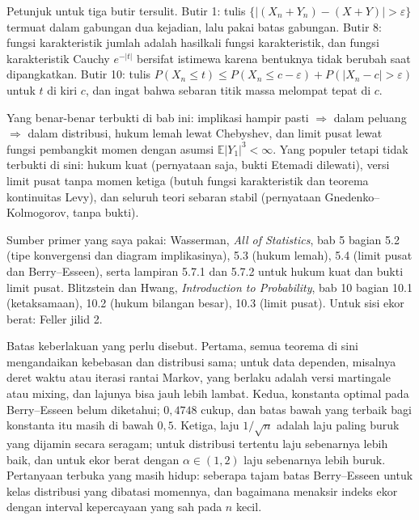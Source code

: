 \begin{latihan}
Petunjuk untuk tiga butir tersulit. Butir 1: tulis
$\{|(X_n+Y_n)-(X+Y)|>\varepsilon\}$ termuat dalam gabungan dua kejadian, lalu
pakai batas gabungan. Butir 8: fungsi karakteristik jumlah adalah hasilkali
fungsi karakteristik, dan fungsi karakteristik Cauchy $e^{-|t|}$ bersifat
istimewa karena bentuknya tidak berubah saat dipangkatkan. Butir 10: tulis
$P(X_n\le t)\le P(X_n\le c-\varepsilon)+P(|X_n-c|>\varepsilon)$ untuk $t$ di
kiri $c$, dan ingat bahwa sebaran titik massa melompat tepat di $c$.
\end{latihan}

\begin{untukpeneliti}
Yang benar-benar terbukti di bab ini: implikasi hampir pasti $\Rightarrow$ dalam
peluang $\Rightarrow$ dalam distribusi, hukum lemah lewat Chebyshev, dan limit
pusat lewat fungsi pembangkit momen dengan asumsi $\mathbb{E}|Y_1|^3<\infty$.
Yang populer tetapi tidak terbukti di sini: hukum kuat (pernyataan saja, bukti
Etemadi dilewati), versi limit pusat tanpa momen ketiga (butuh fungsi
karakteristik dan teorema kontinuitas Levy), dan seluruh teori sebaran stabil
(pernyataan Gnedenko--Kolmogorov, tanpa bukti).

Sumber primer yang saya pakai: Wasserman, \emph{All of Statistics}, bab 5 bagian
5.2 (tipe konvergensi dan diagram implikasinya), 5.3 (hukum lemah), 5.4 (limit
pusat dan Berry--Esseen), serta lampiran 5.7.1 dan 5.7.2 untuk hukum kuat dan
bukti limit pusat. Blitzstein dan Hwang, \emph{Introduction to Probability}, bab
10 bagian 10.1 (ketaksamaan), 10.2 (hukum bilangan besar), 10.3 (limit pusat).
Untuk sisi ekor berat: Feller jilid 2.

Batas keberlakuan yang perlu disebut. Pertama, semua teorema di sini mengandaikan
kebebasan dan distribusi sama; untuk data dependen, misalnya deret waktu atau
iterasi rantai Markov, yang berlaku adalah versi martingale atau mixing, dan
lajunya bisa jauh lebih lambat. Kedua, konstanta optimal pada Berry--Esseen belum
diketahui; $0{,}4748$ cukup, dan batas bawah yang terbaik bagi konstanta itu
masih di bawah $0{,}5$. Ketiga, laju $1/\sqrt n$ adalah laju paling buruk yang
dijamin secara seragam; untuk distribusi tertentu laju sebenarnya lebih baik,
dan untuk ekor berat dengan $\alpha\in(1,2)$ laju sebenarnya lebih buruk.
Pertanyaan terbuka yang masih hidup: seberapa tajam batas Berry--Esseen untuk
kelas distribusi yang dibatasi momennya, dan bagaimana menaksir indeks ekor
dengan interval kepercayaan yang sah pada $n$ kecil.
\end{untukpeneliti}


